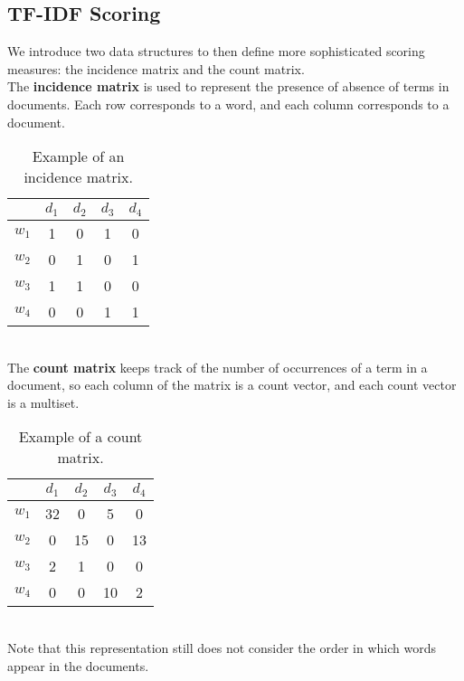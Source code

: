 \subsection{TF-IDF Scoring}

We introduce two data structures to then define more sophisticated scoring measures: the incidence matrix and the count matrix. \\
The \textbf{incidence matrix} is used to represent the presence of absence of terms in documents. Each row corresponds to a word, and each column corresponds to a document.
\begin{table}[!ht]
    \centering
    \begin{tabular}{c|cccc}
        & $d_1$ & $d_2$ & $d_3$ & $d_4$ \\
        \hline
        $w_1$ & 1 & 0 & 1 & 0 \\
        $w_2$ & 0 & 1 & 0 & 1 \\
        $w_3$ & 1 & 1 & 0 & 0 \\
        $w_4$ & 0 & 0 & 1 & 1 \\
    \end{tabular}
    \caption{Example of an incidence matrix.}
    \label{tab:incidence-matrix}
\end{table} \\
The \textbf{count matrix} keeps track of the number of occurrences of a term in a document, so each column of the matrix is a count vector, and each count vector is a multiset.
\begin{table}[!ht]
    \centering
    \begin{tabular}{c|cccc}
        & $d_1$ & $d_2$ & $d_3$ & $d_4$ \\
        \hline
        $w_1$ & 32 & 0 & 5 & 0 \\
        $w_2$ & 0 & 15 & 0 & 13 \\
        $w_3$ & 2 & 1 & 0 & 0 \\
        $w_4$ & 0 & 0 & 10 & 2 \\
    \end{tabular}
    \caption{Example of a count matrix.}
    \label{tab:count-matrix}
\end{table} \\
Note that this representation still does not consider the order in which words appear in the documents.

